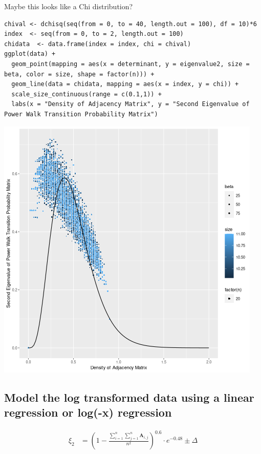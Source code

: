 \documentclass[11pt]{article}
\begin{document}
Maybe this looks like a Chi distribution?

\begin{verbatim}
chival <- dchisq(seq(from = 0, to = 40, length.out = 100), df = 10)*6
index  <- seq(from = 0, to = 2, length.out = 100)
chidata  <- data.frame(index = index, chi = chival)
ggplot(data) +
  geom_point(mapping = aes(x = determinant, y = eigenvalue2, size = beta, color = size, shape = factor(n))) +
  geom_line(data = chidata, mapping = aes(x = index, y = chi)) +
  scale_size_continuous(range = c(0.1,1)) +
  labs(x = "Density of Adjacency Matrix", y = "Second Eigenvalue of Power Walk Transition Probability Matrix")
\end{verbatim}

\begin{center}
\includegraphics[width=.9\linewidth]{../Media/EigenValue_Density_Chi.png}
\end{center}

\subsection{Model the log transformed data using a linear regression or log(-x) regression}
\label{sec:orge122d82}

\begin{align}
    \xi_2 &= \left( 1-  \frac{\sum^{n}_{i= 1} \sum^{n}_{j= 1}   \mathbf{A}_{i,j}  }{n^{2}} \right)^{0.6} \cdot  e^{- 0.48} \pm \Delta
\end{align}
\end{document}
